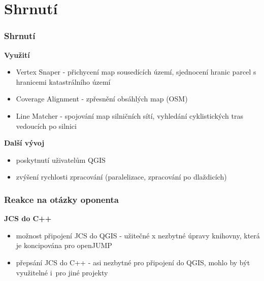 \documentclass[unicode,bookmarksnumbered]{beamer}
\begin{document}
\section{Shrnutí} %
  \begin{frame}
  \frametitle{Shrnutí}
   \textbf{Využití}
     \begin{itemize}
      \item Vertex Snaper - 
	  přichycení map sousedících území,
	  sjednocení hranic parcel s hranicemi katastrálního území
      \item Coverage Alignment - 
	  zpřesnění obsáhlých map (OSM)
      \item Line Matcher - 
	  spojování map silničních sítí,
	  vyhledání cyklistických tras vedoucích po silnici
     \end{itemize}
   \textbf{Další vývoj}
     \begin{itemize}
      \item poskytnutí uživatelům QGIS
      \item zvýšení rychlosti zpracování (paralelizace, zpracování po dlaždicích)
     \end{itemize}
  \end{frame}
 

 \begin{frame}
  \frametitle{Reakce na otázky oponenta}
   \textbf{JCS do C++}
     \begin{itemize}
      \item možnost připojení JCS do QGIS - užitečné x nezbytné úpravy knihovny, která je koncipována pro openJUMP
      \item přepsání JCS do C++ - asi nezbytné pro připojení do QGIS, mohlo by být využitelné i~pro jiné projekty
     \end{itemize}
 \end{frame}
\end{document}
